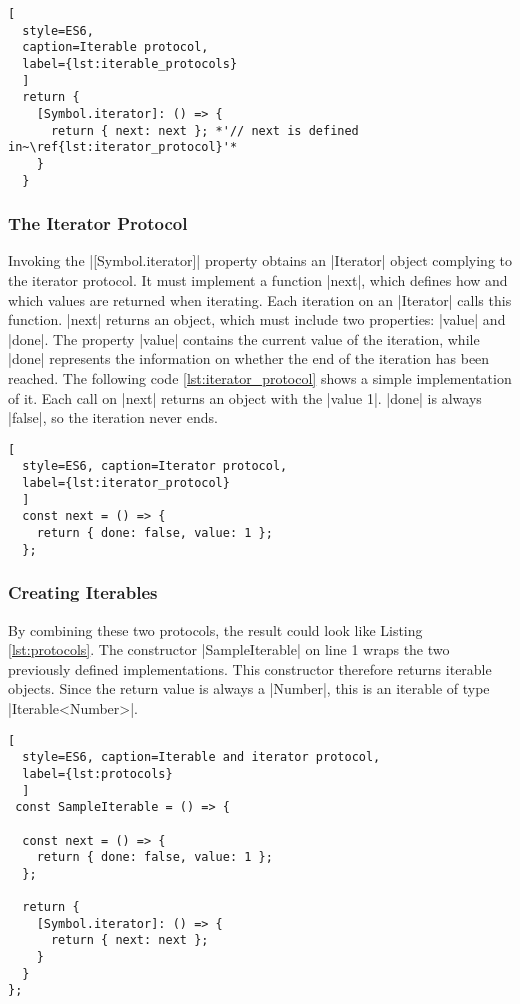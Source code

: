 \begin{lstlisting}[
  style=ES6, 
  caption=Iterable protocol,
  label={lst:iterable_protocols}
  ]
  return {
    [Symbol.iterator]: () => {
      return { next: next }; *'// next is defined in~\ref{lst:iterator_protocol}'*
    }
  }
\end{lstlisting}

\subsubsection{The Iterator Protocol}
\label{subsub:The Iterator Protocol}
Invoking the |[Symbol.iterator]| property obtains an |Iterator| object
complying to the iterator protocol. It must implement a function |next|, which
defines how and which values are returned when iterating. Each iteration on an
|Iterator| calls this function. |next| returns an object, which must
include two properties: |value| and |done|. The property |value|
contains the current value of the iteration, while |done| represents the
information on whether the end of the iteration has been reached. The following
code \ref{lst:iterator_protocol} shows a simple implementation of it. Each call
on |next| returns an object with the |value 1|. |done| is always |false|, so
the iteration never ends. 

\begin{lstlisting}[
  style=ES6, caption=Iterator protocol,
  label={lst:iterator_protocol}
  ]
  const next = () => {
    return { done: false, value: 1 };
  };
\end{lstlisting}

\subsubsection{Creating Iterables}
\label{subsub:Creating Iterables}
By combining these two protocols, the result could look like Listing
\ref{lst:protocols}. The constructor |SampleIterable| on line 1 wraps the two
previously defined implementations. This constructor therefore returns iterable
objects. Since the return value is always a |Number|, this is an iterable of
type |Iterable<Number>|.

\begin{lstlisting}[
  style=ES6, caption=Iterable and iterator protocol,
  label={lst:protocols}
  ]
 const SampleIterable = () => {

  const next = () => {
    return { done: false, value: 1 };
  };

  return {
    [Symbol.iterator]: () => {
      return { next: next };
    }
  }
};
\end{lstlisting}

